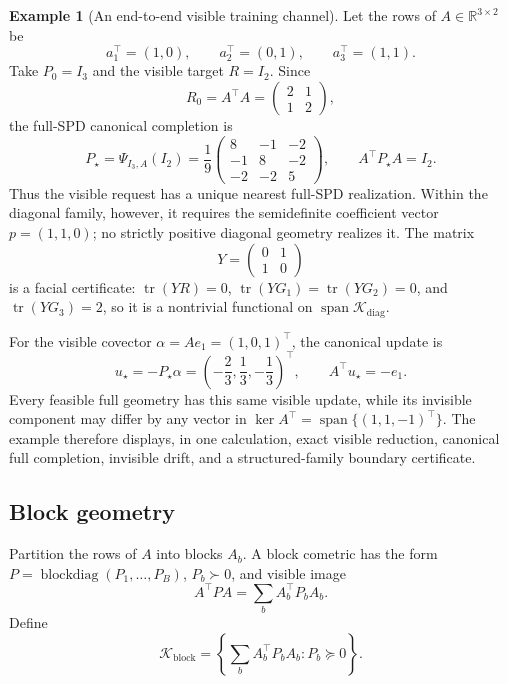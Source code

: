 \documentclass[10pt]{article}
\theoremstyle{plain}
\theoremstyle{definition}
\newtheorem{example}[theorem]{Example}
\theoremstyle{remark}
\newcommand{\R}{\mathbb R}
\newcommand{\tr}{\operatorname{tr}}
\newcommand{\blockdiag}{\operatorname{blockdiag}}
\newcommand{\Kcal}{\mathcal K}
\begin{document}
\begin{example}[An end-to-end visible training channel]
\label{ex:worked-training-channel}
Let the rows of \(A\in\R^{3\times2}\) be
\[
  a_1^\top=(1,0),
  \qquad
  a_2^\top=(0,1),
  \qquad
  a_3^\top=(1,1).
\]
Take \(P_0=I_3\) and the visible target \(R=I_2\).  Since
\[
  R_0=A^\top A=\begin{pmatrix}2&1\\1&2\end{pmatrix},
\]
the full-SPD canonical completion is
\[
  P_\star=\Psi_{I_3,A}(I_2)
  =\frac19
  \begin{pmatrix}
    8&-1&-2\\
    -1&8&-2\\
    -2&-2&5
  \end{pmatrix},
  \qquad A^\top P_\star A=I_2.
\]
Thus the visible request has a unique nearest full-SPD realization.  Within
the diagonal family, however, it requires the semidefinite coefficient vector
\(p=(1,1,0)\); no strictly positive diagonal geometry realizes it.  The
matrix
\[
  Y=\begin{pmatrix}0&1\\1&0\end{pmatrix}
\]
is a facial certificate: \(\tr(YR)=0\),
\(\tr(YG_1)=\tr(YG_2)=0\), and \(\tr(YG_3)=2\), so it is a nontrivial
functional on \(\operatorname{span}\Kcal_{\mathrm{diag}}\).

For the visible covector \(\alpha=Ae_1=(1,0,1)^\top\), the canonical update
is
\[
  u_\star=-P_\star\alpha
  =\left(-\frac23,\frac13,-\frac13\right)^\top,
  \qquad A^\top u_\star=-e_1.
\]
Every feasible full geometry has this same visible update, while its invisible
component may differ by any vector in
\(\ker A^\top=\operatorname{span}\{(1,1,-1)^\top\}\).  The example
therefore displays, in one calculation, exact visible reduction, canonical
full completion, invisible drift, and a structured-family boundary
certificate.
\end{example}

\subsection{Block geometry}

Partition the rows of \(A\) into blocks \(A_b\).  A block cometric has the
form \(P=\blockdiag(P_1,\ldots,P_B)\), \(P_b\succ0\), and visible image
\begin{equation}
  A^\top PA=\sum_bA_b^\top P_bA_b.
  \label{eq:block-image}
\end{equation}
Define
\[
  \Kcal_{\mathrm{block}}
  =\left\{\sum_bA_b^\top P_bA_b:P_b\succeq0\right\}.
\]
\end{document}
